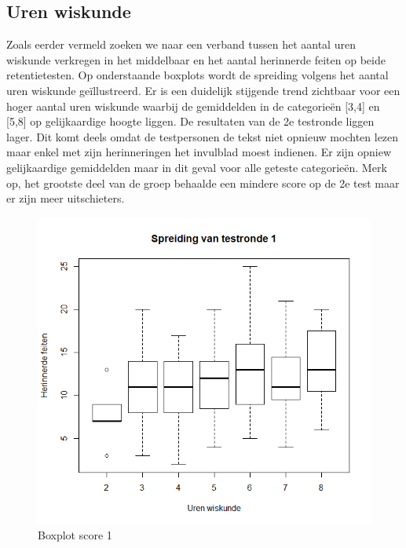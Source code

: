 \documentclass{hogent-article}
\begin{document}
	\subsection{Uren wiskunde}
	Zoals eerder vermeld zoeken we naar een verband tussen het aantal uren wiskunde verkregen in het middelbaar en het aantal herinnerde feiten op beide retentietesten. Op onderstaande boxplots wordt de spreiding volgens het aantal uren wiskunde geïllustreerd. Er is een duidelijk stijgende trend zichtbaar voor een hoger aantal uren wiskunde waarbij de gemiddelden in de categorieën [3,4] en [5,8] op gelijkaardige hoogte liggen. De resultaten van de 2e testronde liggen lager. Dit komt deels omdat de testpersonen de tekst niet opnieuw mochten lezen maar enkel met zijn herinneringen het invulblad moest indienen. Er zijn opniew gelijkaardige gemiddelden maar in dit geval voor alle geteste categorieën. Merk op, het grootste deel van de groep behaalde een mindere score op de 2e test maar er zijn meer uitschieters.
	
	\begin{figure}[H]
		\includegraphics[width=\linewidth]{img/boxplot1.png}
		\caption{Boxplot score 1}
	\end{figure}
\end{document}
